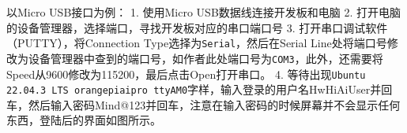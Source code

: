 以Micro USB接口为例： 1. 使用Micro USB数据线连接开发板和电脑 2.
打开电脑的设备管理器，选择端口，寻找开发板对应的串口端口号
3.
打开串口调试软件（PUTTY），将Connection
Type选择为\passthrough{\lstinline!Serial!}，然后在Serial
Line处将端口号修改为设备管理器中查到的端口号，如作者此处端口号为\passthrough{\lstinline!COM3!}，此外，还需要将Speed从9600修改为115200，最后点击Open打开串口。
4.
等待出现\passthrough{\lstinline!Ubuntu 22.04.3 LTS orangepiaipro ttyAM0!}字样，输入登录的用户名HwHiAiUser并回车，然后输入密码Mind@123并回车，注意在输入密码的时候屏幕并不会显示任何东西，登陆后的界面如图所示。
